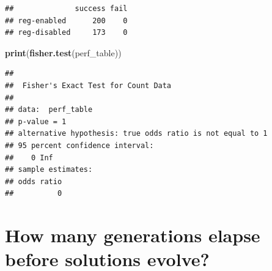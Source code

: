 \documentclass[
]{book}
\newenvironment{Shaded}{\begin{snugshade}}{\end{snugshade}}
\newcommand{\KeywordTok}[1]{\textcolor[rgb]{0.13,0.29,0.53}{\textbf{#1}}}
\newcommand{\NormalTok}[1]{#1}
\begin{document}
\begin{verbatim}
##              success fail
## reg-enabled      200    0
## reg-disabled     173    0
\end{verbatim}

\begin{Shaded}
\begin{Highlighting}[]
\KeywordTok{print}\NormalTok{(}\KeywordTok{fisher.test}\NormalTok{(perf\_table))}
\end{Highlighting}
\end{Shaded}

\begin{verbatim}
## 
##  Fisher's Exact Test for Count Data
## 
## data:  perf_table
## p-value = 1
## alternative hypothesis: true odds ratio is not equal to 1
## 95 percent confidence interval:
##    0 Inf
## sample estimates:
## odds ratio 
##          0
\end{verbatim}

\hypertarget{how-many-generations-elapse-before-solutions-evolve-1}{%
\section{How many generations elapse before solutions evolve?}\label{how-many-generations-elapse-before-solutions-evolve-1}}
\end{document}
